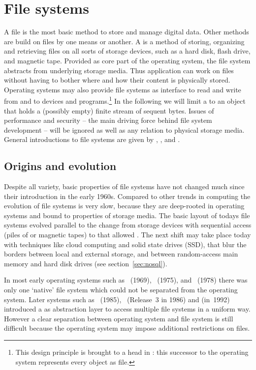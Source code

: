 \section{File systems}
\label{sec:filesystems}

A file is the most basic method to store and manage digital data. Other methods
are build on files by one means or another.  A  is a method
of storing, organizing and retrieving files on all sorts of storage devices,
such as a hard disk, flash drive, and magnetic tape. Provided as core part of
the operating system, the file system abstracts from underlying storage media.
Thus application can work on files without having to bother where and how their
content is physically stored. Operating systems may also provide file systems
as interface to read and write from and to devices and programs.\footnote{This
design principle is brought to a head in : this successor to the
 operating system represents every object as file.} In the following
we will limit a  to an object that holds a (possibly empty) finite
stream of sequent bytes. Issues of performance and security -- the main driving
force behind file system development -- will be ignored as well as any relation
to physical storage media. General introductions to file systems are given by
\textcite{Tanenbaum2008}, \textcite{Reimer2008}, and \textcite{Giampaolo1999}.

\subsection{Origins and evolution}

Despite all variety, basic properties of file systems have not changed much
since their introduction in the early 1960s. Compared to other trends in
computing the evolution of file systems is very slow, because they are
deep-rooted in operating systems and bound to properties of storage media. The
basic layout of todays file systems evolved parallel to the change from storage
devices with sequential access (piles of  or magnetic
tapes) to  that allowed . The next shift may
take place today with techniques like cloud computing and solid state drives
(SSD), that blur the borders between local and external storage, and between
random-access main memory and hard disk drives (see section~\ref{sec:nosql}).

In most early operating systems such as ~(1969),
~(1975), and ~(1978) there was only one `native'
file system which could not be separated from the operating system.  Later
systems such as ~(1985), ~(Release~3 in 1986)
and  (in~1992) introduced a  as
abstraction layer to access multiple file systems in a uniform way. However a
clear separation between operating system and file system is still difficult
because the operating system may impose additional restrictions on files.

